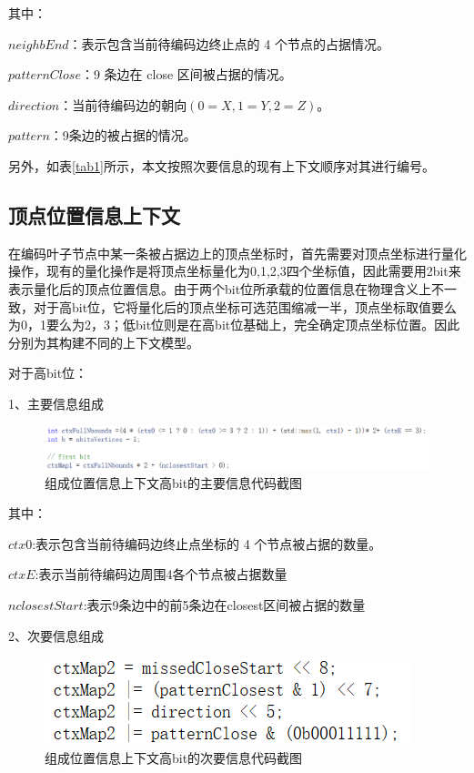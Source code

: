 \documentclass[bachelor,print,msfonts]{xduthesis}
\begin{document}
其中：

$neighbEnd$：表示包含当前待编码边终止点的 4 个节点的占据情况。

$patternClose$：9 条边在 close 区间被占据的情况。

$direction$：当前待编码边的朝向$(0=X,1=Y,2=Z)$。

$pattern$：9条边的被占据的情况。

另外，如表\ref{tab1}所示，本文按照次要信息的现有上下文顺序对其进行编号。

\subsection{顶点位置信息上下文}
在编码叶子节点中某一条被占据边上的顶点坐标时，首先需要对顶点坐标进行量化操作，现有的量化操作是将顶点坐标量化为0,1,2,3四个坐标值，因此需要用2bit来表示量化后的顶点位置信息。由于两个bit位所承载的位置信息在物理含义上不一致，对于高bit位，它将量化后的顶点坐标可选范围缩减一半，顶点坐标取值要么为0，1要么为2，3；低bit位则是在高bit位基础上，完全确定顶点坐标位置。因此分别为其构建不同的上下文模型。

对于高bit位：

1、主要信息组成

\begin{figure}[htbp]
    \centering
    \includegraphics[scale=0.4]{image/position1主要信息组成.png}
    \caption{组成位置信息上下文高bit的主要信息代码截图}
    \label{fig:position1主要信息组成}
\end{figure}

其中：

$ctx0$:表示包含当前待编码边终止点坐标的 4 个节点被占据的数量。

$ctxE$:表示当前待编码边周围4各个节点被占据数量

$nclosestStart$:表示9条边中的前5条边在closest区间被占据的数量


2、次要信息组成

\begin{figure}[htbp]
    \centering
    \includegraphics[scale=0.4]{image/position1次要信息组成.png}
    \caption{组成位置信息上下文高bit的次要信息代码截图}
    \label{fig:positon1次要信息组成}
\end{figure}
\end{document}
